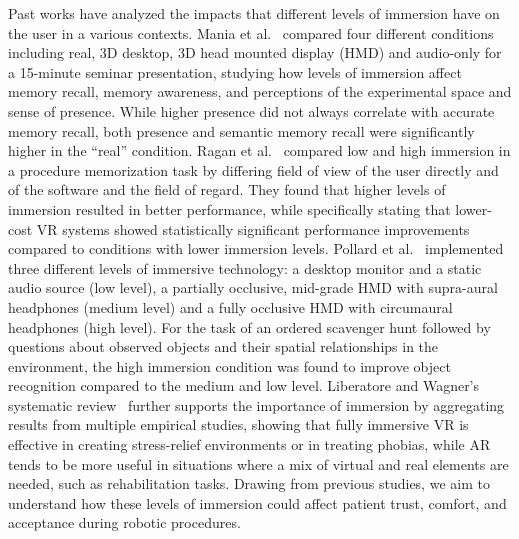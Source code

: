 Past works have analyzed the impacts that different levels of immersion have on the user in a various contexts. Mania et al.~\cite{mania2001effects} compared four different conditions including real, 3D desktop, 3D head mounted display (HMD) and audio-only for a 15-minute seminar presentation, studying how levels of immersion affect memory recall, memory awareness, and perceptions of the experimental space and sense of presence. While higher presence did not always correlate with accurate memory recall, both presence and semantic memory recall were significantly higher in the ``real'' condition. Ragan et al.~\cite{ragan2010effects} compared low and high immersion in a procedure memorization task by differing field of view of the user directly and of the software and the field of regard. They found that higher levels of immersion resulted in better performance, while specifically stating that lower-cost VR systems showed statistically significant performance improvements compared to conditions with lower immersion levels. Pollard et al.~\cite{pollard2020level} implemented three different levels of  immersive technology: a desktop monitor and a static audio source (low level), a partially occlusive, mid-grade HMD with supra-aural headphones (medium level) and a fully occlusive HMD with circumaural headphones (high level). For the task of an ordered scavenger hunt followed by questions about observed objects and their spatial relationships in the environment, the high immersion condition was found to improve object recognition compared to the medium and low level.
Liberatore and Wagner’s systematic review~\cite{liberatore2021virtual} further supports the importance of immersion by aggregating results from multiple empirical studies, showing that fully immersive VR is effective in creating stress-relief environments or in treating phobias, while AR tends to be more useful in situations where a mix of virtual and real elements are needed, such as rehabilitation tasks.
Drawing from previous studies, we aim to understand how these levels of immersion could affect patient trust, comfort, and acceptance during robotic procedures.